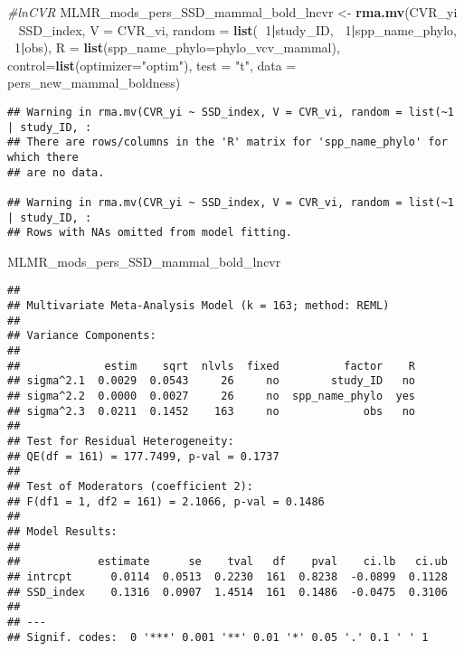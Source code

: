 \documentclass[]{article}
\newenvironment{Shaded}{\begin{snugshade}}{\end{snugshade}}
\newcommand{\KeywordTok}[1]{\textcolor[rgb]{0.13,0.29,0.53}{\textbf{#1}}}
\newcommand{\DataTypeTok}[1]{\textcolor[rgb]{0.13,0.29,0.53}{#1}}
\newcommand{\DecValTok}[1]{\textcolor[rgb]{0.00,0.00,0.81}{#1}}
\newcommand{\StringTok}[1]{\textcolor[rgb]{0.31,0.60,0.02}{#1}}
\newcommand{\CommentTok}[1]{\textcolor[rgb]{0.56,0.35,0.01}{\textit{#1}}}
\newcommand{\OperatorTok}[1]{\textcolor[rgb]{0.81,0.36,0.00}{\textbf{#1}}}
\newcommand{\NormalTok}[1]{#1}
\begin{document}
\begin{Shaded}
\begin{Highlighting}[]
    \CommentTok{#lnCVR}
\NormalTok{    MLMR_mods_pers_SSD_mammal_bold_lncvr <-}\StringTok{ }\KeywordTok{rma.mv}\NormalTok{(CVR_yi }\OperatorTok{~}\StringTok{ }\NormalTok{SSD_index, }\DataTypeTok{V =}\NormalTok{ CVR_vi, }
                                            \DataTypeTok{random =} \KeywordTok{list}\NormalTok{(}\OperatorTok{~}\DecValTok{1}\OperatorTok{|}\NormalTok{study_ID, }\OperatorTok{~}\DecValTok{1}\OperatorTok{|}\NormalTok{spp_name_phylo, }\OperatorTok{~}\DecValTok{1}\OperatorTok{|}\NormalTok{obs), }
                                            \DataTypeTok{R =} \KeywordTok{list}\NormalTok{(}\DataTypeTok{spp_name_phylo=}\NormalTok{phylo_vcv_mammal), }\DataTypeTok{control=}\KeywordTok{list}\NormalTok{(}\DataTypeTok{optimizer=}\StringTok{"optim"}\NormalTok{), }
                                            \DataTypeTok{test =} \StringTok{"t"}\NormalTok{, }\DataTypeTok{data =}\NormalTok{ pers_new_mammal_boldness)}
\end{Highlighting}
\end{Shaded}

\begin{verbatim}
## Warning in rma.mv(CVR_yi ~ SSD_index, V = CVR_vi, random = list(~1 | study_ID, :
## There are rows/columns in the 'R' matrix for 'spp_name_phylo' for which there
## are no data.

## Warning in rma.mv(CVR_yi ~ SSD_index, V = CVR_vi, random = list(~1 | study_ID, :
## Rows with NAs omitted from model fitting.
\end{verbatim}

\begin{Shaded}
\begin{Highlighting}[]
\NormalTok{    MLMR_mods_pers_SSD_mammal_bold_lncvr}
\end{Highlighting}
\end{Shaded}

\begin{verbatim}
## 
## Multivariate Meta-Analysis Model (k = 163; method: REML)
## 
## Variance Components:
## 
##             estim    sqrt  nlvls  fixed          factor    R 
## sigma^2.1  0.0029  0.0543     26     no        study_ID   no 
## sigma^2.2  0.0000  0.0027     26     no  spp_name_phylo  yes 
## sigma^2.3  0.0211  0.1452    163     no             obs   no 
## 
## Test for Residual Heterogeneity:
## QE(df = 161) = 177.7499, p-val = 0.1737
## 
## Test of Moderators (coefficient 2):
## F(df1 = 1, df2 = 161) = 2.1066, p-val = 0.1486
## 
## Model Results:
## 
##            estimate      se    tval   df    pval    ci.lb   ci.ub 
## intrcpt      0.0114  0.0513  0.2230  161  0.8238  -0.0899  0.1128    
## SSD_index    0.1316  0.0907  1.4514  161  0.1486  -0.0475  0.3106    
## 
## ---
## Signif. codes:  0 '***' 0.001 '**' 0.01 '*' 0.05 '.' 0.1 ' ' 1
\end{verbatim}
\end{document}
